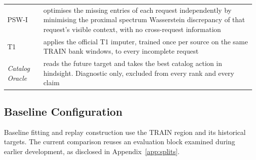 \documentclass{article}
\begin{document}
\begin{table}[!t]
\begin{tabular}{@{}l p{}@{}}
    PSW-I & optimises the missing entries of each request independently by minimising the proximal spectrum Wasserstein discrepancy of that request's visible context, with no cross-request information \\
    T1 & applies the official T1 imputer, trained once per source on the same TRAIN bank windows, to every incomplete request \\
    \emph{Catalog Oracle} & reads the future target and takes the best catalog action in hindsight. Diagnostic only, excluded from every rank and every claim \\
    \bottomrule
  \end{tabular}
\end{table}

\subsection{Baseline Configuration}
\label{app:baseline-config}
Baseline fitting and replay construction use the TRAIN region and its historical targets.
The current comparison reuses an evaluation block examined during earlier development, as
disclosed in Appendix~\ref{app:splits}.
\end{document}
